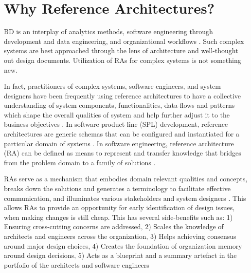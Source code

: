 \documentclass[runningheads]{llncs}
\begin{document}
\section{Why Reference Architectures?}

BD is an interplay of analytics methods, software engineering through development and data engineering, and organizational workflows \cite{Mannering,Selamat}. Such complex systems are best approached through the lens of architecture and well-thought out design documents. Utilization of RAs for complex systems is not something new.

In fact, practitioners of complex systems, software engineers, and system designers have been frequently using reference architectures to have a collective understanding of system components, functionalities, data-flows and patterns which shape the overall qualities of system and help further adjust it to the business objectives \cite{Kohler,Cloutier}. In software product line (SPL) development, reference architectures are generic schemas that can be configured and instantiated for a particular domain of systems \cite{Derras}. In software engineering, reference architecture (RA) can be defined as means to represent and transfer knowledge that bridges from the problem domain to a family of solutions \cite{Klein}.

RAs serve as a mechanism that embodies domain relevant qualities and concepts, breaks down the solutions and generates a terminology to facilitate effective communication, and illuminates various stakeholders and system designers \cite{Klein}. This allows RAs to provide an opportunity for early identification of design issues, when making changes is still cheap. This has several side-benefits such as: 1) Ensuring cross-cutting concerns are addressed, 2) Scales the knowledge of architects and engineers across the organization, 3) Helps achieving consensus around major design choices, 4) Creates the foundation of organization memory around design decisions, 5) Acts as a blueprint and a summary artefact in the portfolio of the architects and software engineers

\end{document}
